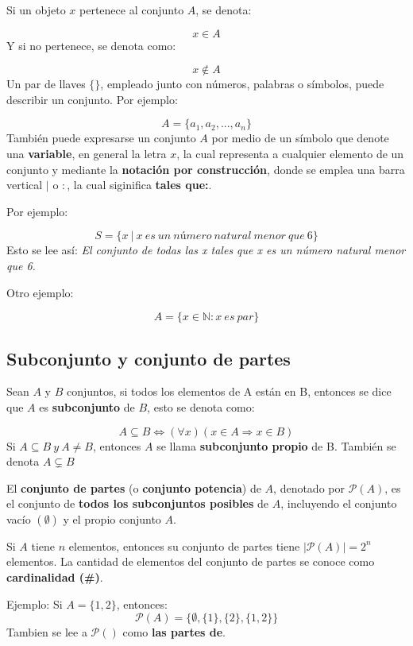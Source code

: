 \documentclass[
  letterpaper,
  DIV=11,
  numbers=noendperiod]{scrreprt}
\begin{document}
Si un objeto \(x\) pertenece al conjunto \(A\), se denota:

\[
x \in A
\] Y si no pertenece, se denota como:

\[
x \notin A
\] Un par de llaves \(\{ \}\), empleado junto con números, palabras o
símbolos, puede describir un conjunto. Por ejemplo:

\[
A = \{a_1, a_2, ... , a_n\}
\] También puede expresarse un conjunto \(A\) por medio de un símbolo
que denote una \textbf{variable}, en general la letra \(x\), la cual
representa a cualquier elemento de un conjunto y mediante la
\textbf{notación por construcción}, donde se emplea una barra vertical
\(|\) o \(:\), la cual siginifica \textbf{tales que:}.

Por ejemplo:

\[
S = \{x \ | \ x \ es \ un \ número \ natural \ menor \ que \ 6\}
\] Esto se lee así: \emph{El conjunto de todas las x tales que x es un
número natural menor que 6.}

Otro ejemplo:

\[
A = \{x \in \mathbb{N} : x \ es \ par \}
\]

\subsection{Subconjunto y conjunto de
partes}\label{subconjunto-y-conjunto-de-partes}

Sean \(A\) y \(B\) conjuntos, si todos los elementos de A están en B,
entonces se dice que \(A\) es \textbf{subconjunto} de \(B\), esto se
denota como:

\[
A \subseteq B \iff ( \forall x)(x \in A \Longrightarrow x \in B
)
\] Si \(A \subseteq B \ y \ A \neq  B\), entonces \(A\) se llama
\textbf{subconjunto propio} de B. También se denota \(A\subsetneq B\)

El \textbf{conjunto de partes} (o \textbf{conjunto potencia}) de \(A\),
denotado por \(\mathcal{P}(A)\), es el conjunto de \textbf{todos los
subconjuntos posibles} de \(A\), incluyendo el conjunto vacío
\((\emptyset)\) y el propio conjunto \(A\).

Si \(A\) tiene \(n\) elementos, entonces su conjunto de partes tiene
\(|\mathcal{P}(A)| = 2^n\) elementos. La cantidad de elementos del
conjunto de partes se conoce como \textbf{cardinalidad (\#)}.

Ejemplo: Si \(A = \{ 1, 2 \}\), entonces:\\
\[
\mathcal{P}(A) = \{ \emptyset, \{ 1\}, \{ 2\}, \{ 1,2\} \}
\] Tambien se lee a \(\mathcal{P}()\) como \textbf{las partes de}.
\end{document}
